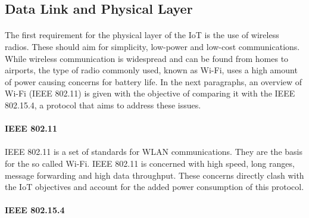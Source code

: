 \subsection{Data Link and Physical Layer}

\paragraph{}
The first requirement for the physical layer of the \gls{IoT} is the use of wireless radios. These should aim for simplicity, low-power and low-cost communications. While wireless communication is widespread and can be found from homes to airports, the type of radio commonly used, known as Wi-Fi, uses a high amount of power causing concerns for battery life. In the next paragraphs, an overview of Wi-Fi (IEEE 802.11) is given with the objective of comparing it with the IEEE 802.15.4, a protocol that aims to address these issues.

\paragraph{\textbf{IEEE 802.11}}
\paragraph{}
IEEE 802.11 \cite{IEEE2012} is a set of standards for \gls{WLAN} communications. They are the basis for the so called Wi-Fi. IEEE 802.11 is concerned with high speed, long ranges, message forwarding and high data throughput. These concerns directly clash with the \gls{IoT} objectives and account for the added power consumption of this protocol.

\paragraph{\textbf{IEEE 802.15.4}}
